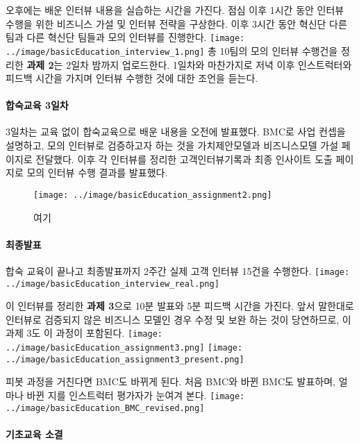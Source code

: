 \documentclass[
  letterpaper,
  DIV=11,
  numbers=noendperiod]{scrartcl}
\let\oldparagraph\paragraph
\renewcommand{\paragraph}[1]{\oldparagraph{#1}\mbox{}}
\begin{document}
오후에는 배운 인터뷰 내용을 실습하는 시간을 가진다. 점심 이후 1시간 동안
인터뷰 수행을 위한 비즈니스 가설 및 인터뷰 전략을 구상한다. 이후 3시간
동안 혁신단 다른 팀과 다른 혁신단 팀들과 모의 인터뷰를 진행한다.
\texttt{[image: ../image/basicEducation\_interview\_1.png]} 총 10팀의 모의
인터뷰 수행건을 정리한 \textbf{과제 2}는 2일차 밤까지 업로드한다.
1일차와 마찬가지로 저녁 이후 인스트럭터와 피드백 시간을 가지며 인터뷰
수행한 것에 대한 조언을 듣는다.

\hypertarget{uxd569uxc219uxad50uxc721-3uxc77cuxcc28}{%
\paragraph{합숙교육
3일차}\label{uxd569uxc219uxad50uxc721-3uxc77cuxcc28}}

3일차는 교육 없이 합숙교육으로 배운 내용을 오전에 발표했다. BMC로 사업
컨셉을 설명하고, 모의 인터뷰로 검증하고자 하는 것을 가치제안모델과
비즈니스모델 가설 페이지로 전달했다. 이후 각 인터뷰를 정리한
고객인터뷰기록과 최종 인사이트 도출 페이지로 모의 인터뷰 수행 결과를
발표했다.

\begin{figure}

{\centering \texttt{[image: ../image/basicEducation\_assignment2.png]}

}

\caption{여기}

\end{figure}

\hypertarget{uxcd5cuxc885uxbc1cuxd45c}{%
\paragraph{최종발표}\label{uxcd5cuxc885uxbc1cuxd45c}}

합숙 교육이 끝나고 최종발표까지 2주간 실제 고객 인터뷰 15건을 수행한다.
\texttt{[image: ../image/basicEducation\_interview\_real.png]}

이 인터뷰를 정리한 \textbf{과제 3}으로 10분 발표와 5분 피드백 시간을
가진다. 앞서 말한대로 인터뷰로 검증되지 않은 비즈니스 모델인 경우 수정
및 보완 하는 것이 당연하므로, 이 과제 3도 이 과정이 포함된다.
\texttt{[image: ../image/basicEducation\_assignment3.png]}
\texttt{[image: ../image/basicEducation\_assignment3\_present.png]}

피봇 과정을 거친다면 BMC도 바뀌게 된다. 처음 BMC와 바뀐 BMC도 발표하며,
얼마나 바뀐 지를 인스트럭터 평가자가 눈여겨 본다.
\texttt{[image: ../image/basicEducation\_BMC\_revised.png]}

\hypertarget{uxae30uxcd08uxad50uxc721-uxc18cuxacb0}{%
\paragraph{기초교육 소결}\label{uxae30uxcd08uxad50uxc721-uxc18cuxacb0}}
\end{document}
